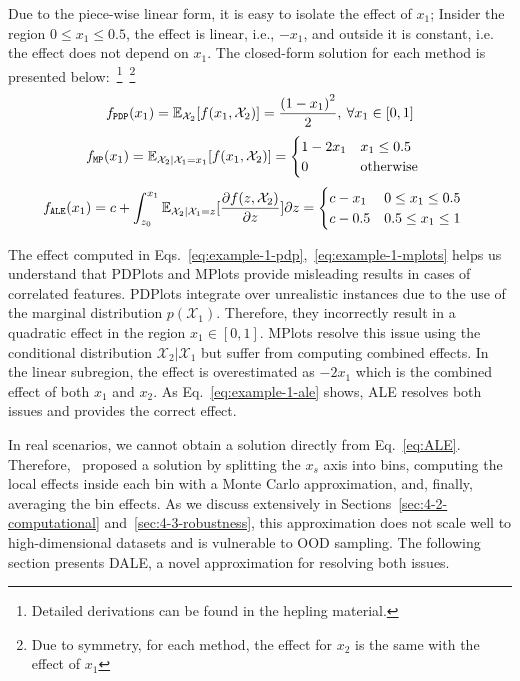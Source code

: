 Due to the piece-wise linear form, it is easy to isolate the effect of
\(x_1\); Insider the region \(0 \leq x_1 \leq 0.5\), the effect is
linear, i.e., \(-x_1\), and outside it is constant, i.e. the effect
does not depend on \(x_1\). The closed-form solution for each method
is presented below:~\footnote{Detailed derivations can be found in the
  hepling material.}~\footnote{ Due to symmetry, for each method, the
  effect for \(x_2\) is the same with the effect of \(x_1\)}
%
\begin{equation}\label{eq:example-1-pdp} f_{\mathtt{PDP}}(x_1) = \mathbb{\mathbb{E}}_{\mathcal{X}_2}[f(x_1,\mathcal{X}_2)] = \frac{{(1-x_1)}^2}{2}, \: \forall x_1 \in [0,1]
\end{equation}
%
\begin{equation} \label{eq:example-1-mplots}
  \begin{split} f_{\mathtt{MP}}(x_1) &= \mathbb{E}_{\mathcal{X}_2|\mathcal{X}_1 = x_1}[f(x_1, \mathcal{X}_2)] = \begin{cases} 1 - 2x_1 & x_1 \leq 0.5 \\ 0 &\text{otherwise}
    \end{cases}
  \end{split}
\end{equation}
%
\begin{align}\label{eq:example-1-ale}
  \begin{split} f_{\mathtt{ALE}}(x_1) &= c + \int_{z_0}^{x_1} \mathbb{E}_{\mathcal{X}_2|\mathcal{X}_1=z} [\frac{\partial f(z, \mathcal{X}_2)}{\partial z}] \partial z =
     \begin{cases} c - x_1 & 0 \leq x_1 \leq 0.5\\ c - 0.5 & 0.5 \leq x_1 \leq 1
    \end{cases}
  \end{split}
\end{align}

The effect computed in Eqs.~\eqref{eq:example-1-pdp},~\eqref{eq:example-1-mplots} helps us understand that PDPlots and MPlots provide misleading results in cases of correlated features. PDPlots integrate over unrealistic instances due to the use of the marginal distribution \( p(\mathcal{X}_1) \). Therefore, they incorrectly result in a quadratic effect in the region \(x_1 \in [0, 1]\). MPlots resolve this issue using the conditional distribution \( \mathcal{X}_2|\mathcal{X}_1 \) but suffer from computing combined effects. In the linear subregion, the effect is overestimated as \( -2x_1 \) which is the combined effect of both \( x_1 \) and \( x_2 \). As Eq.~\eqref{eq:example-1-ale} shows, ALE resolves both issues and provides the correct effect.

In real scenarios, we cannot obtain a solution directly from Eq.~\eqref{eq:ALE}. Therefore,~\cite{Apley2020} proposed a solution by splitting the \(x_s\) axis into bins, computing the local effects inside each bin with a Monte Carlo approximation, and, finally, averaging the bin effects. As we discuss extensively in Sections~\ref{sec:4-2-computational} and~\ref{sec:4-3-robustness}, this approximation does not scale well to high-dimensional datasets and is vulnerable to OOD sampling. The following section presents DALE, a novel approximation for resolving both issues.
